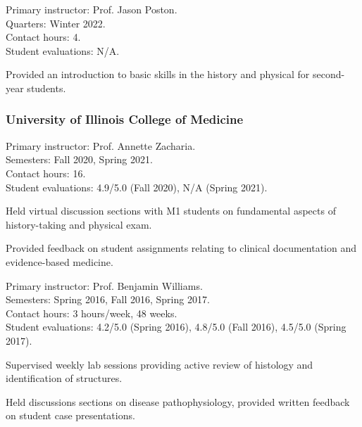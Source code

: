 \documentclass[%
]{komacv}
\begin{document}
{Primary instructor: Prof. Jason Poston.\\
Quarters: Winter 2022.\\
Contact hours: 4.\\
Student evaluations: N/A.
\begin{compactitem}
\item Provided an introduction to basic skills in the history and physical for second-year students.
\end{compactitem}}

\subsubsection{University of Illinois College of Medicine}

{Primary instructor: Prof. Annette Zacharia.\\
Semesters: Fall 2020, Spring 2021.\\
Contact hours: 16.\\
Student evaluations: 4.9/5.0 (Fall 2020), N/A (Spring 2021).
\begin{compactitem}
\item Held virtual discussion sections with M1 students on fundamental aspects of history-taking and physical exam.
\item Provided feedback on student assignments relating to clinical documentation and evidence-based medicine.
\end{compactitem}}

{Primary instructor: Prof. Benjamin Williams.\\
Semesters: Spring 2016, Fall 2016, Spring 2017.\\
Contact hours: 3 hours/week, 48 weeks.\\
Student evaluations: 4.2/5.0 (Spring 2016), 4.8/5.0 (Fall 2016), 4.5/5.0 (Spring 2017).
\begin{compactitem}
\item Supervised weekly lab sessions providing active review of histology and identification of structures.
\item Held discussions sections on disease pathophysiology, provided written feedback on student case presentations.
\end{compactitem}}

%
\end{document}
